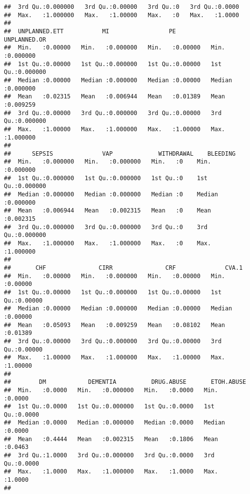 \documentclass[]{article}
\begin{document}
\begin{verbatim}
##  3rd Qu.:0.000000   3rd Qu.:0.00000   3rd Qu.:0   3rd Qu.:0.0000  
##  Max.   :1.000000   Max.   :1.00000   Max.   :0   Max.   :1.0000  
##                                                                   
##  UNPLANNED.ETT           MI                 PE           UNPLANNED.OR     
##  Min.   :0.00000   Min.   :0.000000   Min.   :0.00000   Min.   :0.000000  
##  1st Qu.:0.00000   1st Qu.:0.000000   1st Qu.:0.00000   1st Qu.:0.000000  
##  Median :0.00000   Median :0.000000   Median :0.00000   Median :0.000000  
##  Mean   :0.02315   Mean   :0.006944   Mean   :0.01389   Mean   :0.009259  
##  3rd Qu.:0.00000   3rd Qu.:0.000000   3rd Qu.:0.00000   3rd Qu.:0.000000  
##  Max.   :1.00000   Max.   :1.000000   Max.   :1.00000   Max.   :1.000000  
##                                                                           
##      SEPSIS              VAP             WITHDRAWAL    BLEEDING       
##  Min.   :0.000000   Min.   :0.000000   Min.   :0    Min.   :0.000000  
##  1st Qu.:0.000000   1st Qu.:0.000000   1st Qu.:0    1st Qu.:0.000000  
##  Median :0.000000   Median :0.000000   Median :0    Median :0.000000  
##  Mean   :0.006944   Mean   :0.002315   Mean   :0    Mean   :0.002315  
##  3rd Qu.:0.000000   3rd Qu.:0.000000   3rd Qu.:0    3rd Qu.:0.000000  
##  Max.   :1.000000   Max.   :1.000000   Max.   :0    Max.   :1.000000  
##                                                                       
##       CHF               CIRR               CRF              CVA.1        
##  Min.   :0.00000   Min.   :0.000000   Min.   :0.00000   Min.   :0.00000  
##  1st Qu.:0.00000   1st Qu.:0.000000   1st Qu.:0.00000   1st Qu.:0.00000  
##  Median :0.00000   Median :0.000000   Median :0.00000   Median :0.00000  
##  Mean   :0.05093   Mean   :0.009259   Mean   :0.08102   Mean   :0.01389  
##  3rd Qu.:0.00000   3rd Qu.:0.000000   3rd Qu.:0.00000   3rd Qu.:0.00000  
##  Max.   :1.00000   Max.   :1.000000   Max.   :1.00000   Max.   :1.00000  
##                                                                          
##        DM            DEMENTIA          DRUG.ABUSE       ETOH.ABUSE    
##  Min.   :0.0000   Min.   :0.000000   Min.   :0.0000   Min.   :0.0000  
##  1st Qu.:0.0000   1st Qu.:0.000000   1st Qu.:0.0000   1st Qu.:0.0000  
##  Median :0.0000   Median :0.000000   Median :0.0000   Median :0.0000  
##  Mean   :0.4444   Mean   :0.002315   Mean   :0.1806   Mean   :0.0463  
##  3rd Qu.:1.0000   3rd Qu.:0.000000   3rd Qu.:0.0000   3rd Qu.:0.0000  
##  Max.   :1.0000   Max.   :1.000000   Max.   :1.0000   Max.   :1.0000  
##                                                                       

\end{verbatim}
\end{document}
